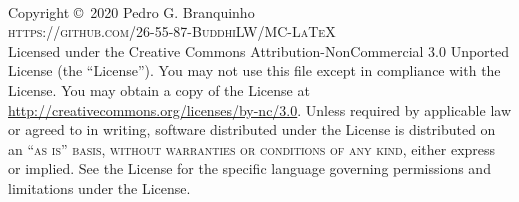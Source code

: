 \documentclass[12pt, brazilian, a5paper]{abntex2} %
\begin{document}

\begingroup
\thispagestyle{empty} %
\vfill
\endgroup


\newpage
~\vfill
\thispagestyle{empty}

\noindent Copyright \copyright\ 2020 Pedro G. Branquinho\\ %


\noindent \textsc{https://github.com/26-55-87-BuddhiLW/MC-LaTeX}\\ %

\noindent Licensed under the Creative Commons Attribution-NonCommercial 3.0 Unported License (the ``License''). You may not use this file except in compliance with the License. You may obtain a copy of the License at \url{http://creativecommons.org/licenses/by-nc/3.0}. Unless required by applicable law or agreed to in writing, software distributed under the License is distributed on an \textsc{``as is'' basis, without warranties or conditions of any kind}, either express or implied. See the License for the specific language governing permissions and limitations under the License.\\ %
\end{document}
